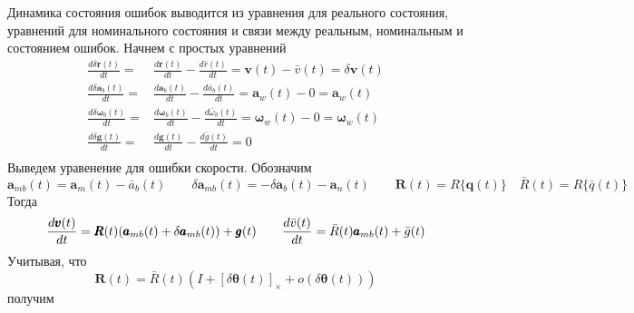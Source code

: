 \documentclass[12pt]{article}
\begin{document}
Динамика состояния ошибок выводится из уравнения для реального состояния,
уравнений для номинального состояния и связи между реальным, номинальным и состоянием ошибок.
Начнем с простых уравнений
\begin{equation}
    \begin{aligned}
        \frac{d \delta\pmb{r}(t)}{d t}
        = & \frac{d \pmb{r}(t)}{dt} - \frac{d\bar{r}(t)}{d t}
        =\pmb{v}(t)-\bar{v}(t)
        =\delta\pmb{v}(t)                                                   \\
        \frac{d \delta\pmb{a}_b(t)}{d t}
        = & \frac{d \pmb{a}_b(t)}{dt} - \frac{d\bar{a}_b(t)}{d t}
        =\pmb{a}_w(t)-0
        =\pmb{a}_w(t)                                                       \\
        \frac{d \delta\pmb{\omega}_b(t)}{d t}
        = & \frac{d \pmb{\omega}_b(t)}{dt} - \frac{d\bar{\omega}_b(t)}{d t}
        =\pmb{\omega}_w(t) - 0
        =\pmb{\omega}_w(t)                                                  \\
        \frac{d \delta\pmb{g}(t)}{d t}
        = & \frac{d \pmb{g}(t)}{dt} - \frac{d\bar{g}(t)}{d t}
        =0                                                                  \\
    \end{aligned}
\end{equation}
Выведем уравенение для ошибки скорости. Обозначим
\begin{equation}
    \pmb{a}_{mb}(t)=\pmb{a}_m(t)-\bar{a}_b(t)  \qquad
    \delta \pmb{a}_{mb}(t)=-\delta \pmb{a}_b(t)-\pmb{a}_n(t)  \qquad
    \pmb{R}(t)=R\{\pmb{q}(t)\} \quad
    \bar{R}(t)=R\{\bar{q}(t)\}
\end{equation}
Тогда
\begin{equation}
    \frac{d \pmb{v}(t)}{d t}=\pmb{R}(t) (\pmb{a}_{mb}(t)+\delta\pmb{a}_{mb}(t)) + \pmb{g}(t)\\
    \qquad
    \frac{d \bar{v}(t)}{d t}=\bar{R}(t) \pmb{a}_{mb}(t) + \bar{g}(t)\\
\end{equation}
Учитывая, что
\begin{equation}
    \pmb{R}(t)=\bar{R}(t)(I+[\delta\pmb{\theta}(t)]_\times+o(\delta\pmb{\theta}(t)))
\end{equation}
получим
\end{document}
